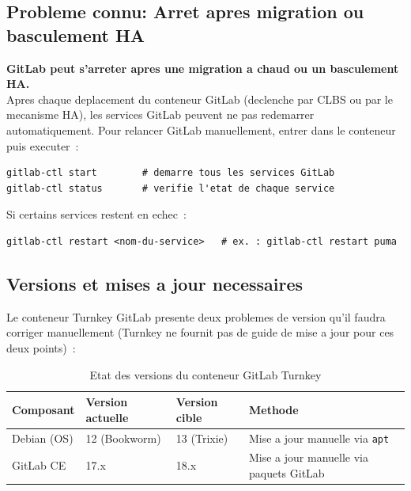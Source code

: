 \documentclass[a4paper,11pt]{article}
\newenvironment{warnbox}{%
  \begin{mdframed}[linecolor=orange,backgroundcolor=orange!8,linewidth=1pt,
    leftmargin=0pt,rightmargin=0pt,innertopmargin=6pt,innerbottommargin=6pt]
}{%
  \end{mdframed}
}
\begin{document}
\subsection{Probleme connu: Arret apres migration ou basculement HA}

\begin{warnbox}
  \textbf{GitLab peut s'arreter apres une migration a chaud ou un basculement HA.}\\
  Apres chaque deplacement du conteneur GitLab (declenche par CLBS ou par le
  mecanisme HA), les services GitLab peuvent ne pas redemarrer automatiquement.
  Pour relancer GitLab manuellement, entrer dans le conteneur puis executer~:
\end{warnbox}

\begin{lstlisting}[style=shellstyle]
gitlab-ctl start        # demarre tous les services GitLab
gitlab-ctl status       # verifie l'etat de chaque service
\end{lstlisting}

Si certains services restent en echec~:

\begin{lstlisting}[style=shellstyle]
gitlab-ctl restart <nom-du-service>   # ex. : gitlab-ctl restart puma
\end{lstlisting}

\subsection{Versions et mises a jour necessaires}

Le conteneur Turnkey GitLab presente deux problemes de version qu'il faudra
corriger manuellement (Turnkey ne fournit pas de guide de mise a jour pour ces deux points)~:

\begin{table}[H]
  \caption{Etat des versions du conteneur GitLab Turnkey}
  \centering
  \begin{tabular}{L{3.5cm}C{2.5cm}C{2.5cm}L{4cm}}
    \toprule
    \textbf{Composant} & \textbf{Version actuelle} & \textbf{Version cible} & \textbf{Methode} \\
    \midrule
    Debian (OS)  & 12 (Bookworm) & 13 (Trixie) & Mise a jour manuelle via \texttt{apt} \\
    GitLab CE    & 17.x          & 18.x        & Mise a jour manuelle via paquets GitLab \\
    \bottomrule
  \end{tabular}
\end{table}
\end{document}
